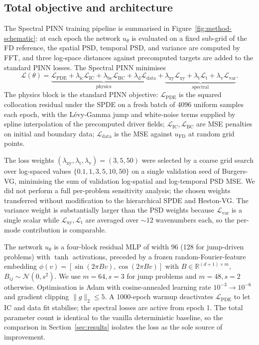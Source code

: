 \documentclass[review,12pt]{elsarticle}
\begin{document}
\subsection{Total objective and architecture}
\label{subsec:total-objective}

The Spectral PINN training pipeline is summarised in
Figure~\ref{fig:method-schematic}: at each epoch the network
\(u_\theta\) is evaluated on a fixed sub-grid of the FD reference,
the spatial PSD, temporal PSD, and variance are computed by FFT,
and three log-space distances against precomputed targets are
added to the standard PINN losses. The Spectral PINN minimises
\begin{equation}
\mathcal{L}(\theta) =
\underbrace{\mathcal L_{\mathrm{PDE}}
+ \lambda_{\mathrm{ic}} \mathcal L_{\mathrm{IC}}
+ \lambda_{\mathrm{bc}} \mathcal L_{\mathrm{BC}}
+ \lambda_{\mathrm d} \mathcal L_{\mathrm{data}}}_{\text{physics}}
+ \underbrace{\lambda_{\mathrm{xy}} \mathcal L_{\mathrm{xy}}
+ \lambda_{\mathrm t} \mathcal L_{\mathrm t}
+ \lambda_{\mathrm v} \mathcal L_{\mathrm{var}}}_{\text{spectral}}.
\label{eq:total-loss}
\end{equation}
The physics block is the standard PINN objective:
\(\mathcal L_{\mathrm{PDE}}\) is the squared collocation residual
under the SPDE on a fresh batch of 4096 uniform samples each epoch,
with the L\'evy-Gamma jump and white-noise terms supplied by spline
interpolation of the precomputed driver fields;
\(\mathcal L_{\mathrm{IC}}, \mathcal L_{\mathrm{BC}}\) are MSE
penalties on initial and boundary data; \(\mathcal L_{\mathrm{data}}\)
is the MSE against \(u_{\mathrm{FD}}\) at random grid points.

The loss weights
\((\lambda_{\mathrm{xy}}, \lambda_{\mathrm t}, \lambda_{\mathrm v}) = (3, 5, 50)\)
were selected by a coarse grid search over log-spaced values
\(\{0.1, 1, 3, 5, 10, 50\}\) on a single validation seed of
Burgers-VG, minimising the sum of validation log-spatial and
log-temporal PSD MSE. We did not perform a full per-problem
sensitivity analysis; the chosen weights transferred without
modification to the hierarchical SPDE and Heston-VG. The variance
weight is substantially larger than the PSD weights because
\(\mathcal L_{\mathrm{var}}\) is a single scalar while
\(\mathcal L_{\mathrm{xy}}, \mathcal L_{\mathrm{t}}\) are averaged
over \(\sim 12\) wavenumbers each, so the per-mode contribution is
comparable.

The network \(u_\theta\) is a four-block residual MLP of width 96
(128 for jump-driven problems) with \(\tanh\) activations, preceded
by a frozen random-Fourier-feature embedding
\(\phi(v) = [\sin(2\pi B v), \cos(2\pi B v)]\) with
\(B \in \mathbb R^{(d+1)\times m}\),
\(B_{ij} \sim \mathcal N(0, s^2)\). We use \(m=64, s=3\) for jump
problems and \(m=48, s=2\) otherwise. Optimisation is Adam with
cosine-annealed learning rate \(10^{-3} \to 10^{-6}\) and gradient
clipping \(\|g\|_2 \le 5\). A 1000-epoch warmup deactivates
\(\mathcal L_{\mathrm{PDE}}\) to let IC and data fit stabilise; the
spectral losses are active from epoch 1. The total parameter count
is identical to the vanilla deterministic baseline, so the
comparison in Section~\ref{sec:results} isolates the loss as the
sole source of improvement.
\end{document}
